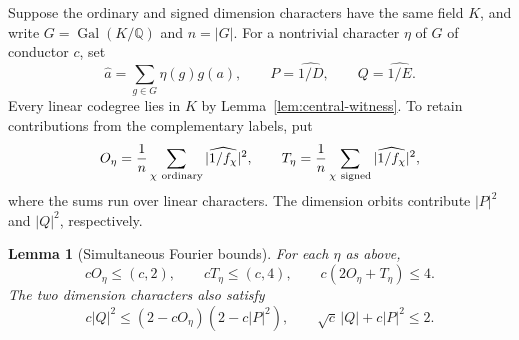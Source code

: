 \documentclass[11pt,reqno]{amsart}
\newtheorem{lemma}[theorem]{Lemma}
\theoremstyle{remark}\newtheorem{remark}[theorem]{Remark}
\numberwithin{equation}{section}
\begin{document}
Suppose the ordinary and signed dimension characters have the same
field $K$, and write $G=\operatorname{Gal}(K/\mathbb Q)$ and $n=|G|$.
For a nontrivial character $\eta$ of $G$ of conductor $c$, set
\[
  \widehat a=\sum_{g\in G}\eta(g)g(a),\qquad
  P=\widehat{1/D},\qquad Q=\widehat{1/E}.
\]
Every linear codegree lies in $K$ by Lemma~\ref{lem:central-witness}.
To retain contributions from the complementary labels, put
\[
  O_\eta=\frac1n\sum_{\chi\ {\rm ordinary}}|\widehat{1/f_\chi}|^2,
  \qquad
  T_\eta=\frac1n\sum_{\chi\ {\rm signed}}|\widehat{1/f_\chi}|^2,
\]
where the sums run over linear characters. The dimension orbits
contribute $|P|^2$ and $|Q|^2$, respectively.

\begin{lemma}[Simultaneous Fourier bounds]\label{lem:sextic-matrix-compression}
For each $\eta$ as above,
\begin{equation}\label{eq:orbit-projection}
  cO_\eta\le(c,2),\qquad cT_\eta\le(c,4),\qquad
  c(2O_\eta+T_\eta)\le4 .
\end{equation}
The two dimension characters also satisfy
\[
 c|Q|^2\le(2-cO_\eta)(2-c|P|^2),\qquad
 \sqrt c\,|Q|+c|P|^2\le2.
\]
\end{lemma}
\end{document}
